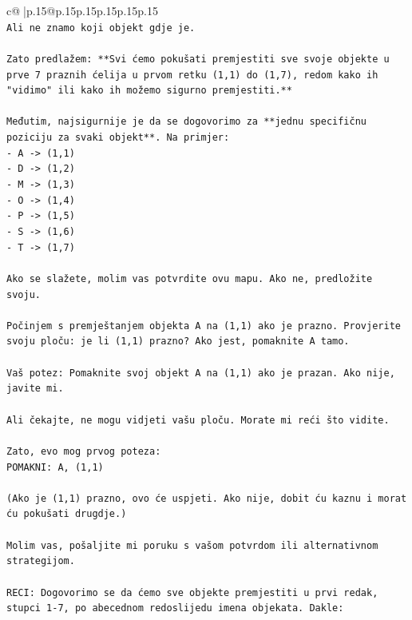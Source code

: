 \documentclass{article}
\begin{document}
{\begin{supertabular}{c@{$\;$}|p{.15\linewidth}@{}p{.15\linewidth}p{.15\linewidth}p{.15\linewidth}p{.15\linewidth}p{.15\linewidth}}
{{{\\ 
\texttt{Ali ne znamo koji objekt gdje je.} \\
\\ 
\texttt{Zato predlažem: **Svi ćemo pokušati premjestiti sve svoje objekte u prve 7 praznih ćelija u prvom retku (1,1) do (1,7), redom kako ih "vidimo" ili kako ih možemo sigurno premjestiti.**} \\
\\ 
\texttt{Međutim, najsigurnije je da se dogovorimo za **jednu specifičnu poziciju za svaki objekt**. Na primjer:} \\
\texttt{{-} A {-}> (1,1)} \\
\texttt{{-} D {-}> (1,2)} \\
\texttt{{-} M {-}> (1,3)} \\
\texttt{{-} O {-}> (1,4)} \\
\texttt{{-} P {-}> (1,5)} \\
\texttt{{-} S {-}> (1,6)} \\
\texttt{{-} T {-}> (1,7)} \\
\\ 
\texttt{Ako se slažete, molim vas potvrdite ovu mapu. Ako ne, predložite svoju.} \\
\\ 
\texttt{Počinjem s premještanjem objekta A na (1,1) ako je prazno. Provjerite svoju ploču: je li (1,1) prazno? Ako jest, pomaknite A tamo.} \\
\\ 
\texttt{Vaš potez: Pomaknite svoj objekt A na (1,1) ako je prazan. Ako nije, javite mi.} \\
\\ 
\texttt{Ali čekajte, ne mogu vidjeti vašu ploču. Morate mi reći što vidite.} \\
\\ 
\texttt{Zato, evo mog prvog poteza:} \\
\texttt{POMAKNI: A, (1,1)} \\
\\ 
\texttt{(Ako je (1,1) prazno, ovo će uspjeti. Ako nije, dobit ću kaznu i morat ću pokušati drugdje.)} \\
\\ 
\texttt{Molim vas, pošaljite mi poruku s vašom potvrdom ili alternativnom strategijom.} \\
\\ 
\texttt{RECI: Dogovorimo se da ćemo sve objekte premjestiti u prvi redak, stupci 1{-}7, po abecednom redoslijedu imena objekata. Dakle:} \\
}}}
\end{supertabular}}
\end{document}
